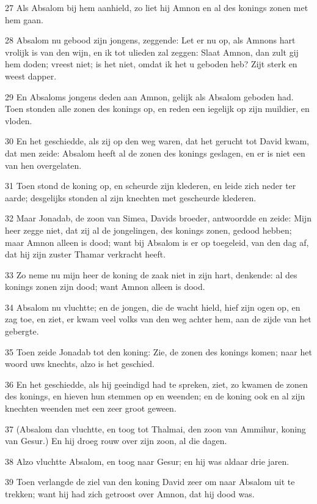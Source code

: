 \par 27 Als Absalom bij hem aanhield, zo liet hij Amnon en al des konings zonen met hem gaan.
\par 28 Absalom nu gebood zijn jongens, zeggende: Let er nu op, als Amnons hart vrolijk is van den wijn, en ik tot ulieden zal zeggen: Slaat Amnon, dan zult gij hem doden; vreest niet; is het niet, omdat ik het u geboden heb? Zijt sterk en weest dapper.
\par 29 En Absaloms jongens deden aan Amnon, gelijk als Absalom geboden had. Toen stonden alle zonen des konings op, en reden een iegelijk op zijn muildier, en vloden.
\par 30 En het geschiedde, als zij op den weg waren, dat het gerucht tot David kwam, dat men zeide: Absalom heeft al de zonen des konings geslagen, en er is niet een van hen overgelaten.
\par 31 Toen stond de koning op, en scheurde zijn klederen, en leide zich neder ter aarde; desgelijks stonden al zijn knechten met gescheurde klederen.
\par 32 Maar Jonadab, de zoon van Simea, Davids broeder, antwoordde en zeide: Mijn heer zegge niet, dat zij al de jongelingen, des konings zonen, gedood hebben; maar Amnon alleen is dood; want bij Absalom is er op toegeleid, van den dag af, dat hij zijn zuster Thamar verkracht heeft.
\par 33 Zo neme nu mijn heer de koning de zaak niet in zijn hart, denkende: al des konings zonen zijn dood; want Amnon alleen is dood.
\par 34 Absalom nu vluchtte; en de jongen, die de wacht hield, hief zijn ogen op, en zag toe, en ziet, er kwam veel volks van den weg achter hem, aan de zijde van het gebergte.
\par 35 Toen zeide Jonadab tot den koning: Zie, de zonen des konings komen; naar het woord uws knechts, alzo is het geschied.
\par 36 En het geschiedde, als hij geeindigd had te spreken, ziet, zo kwamen de zonen des konings, en hieven hun stemmen op en weenden; en de koning ook en al zijn knechten weenden met een zeer groot geween.
\par 37 (Absalom dan vluchtte, en toog tot Thalmai, den zoon van Ammihur, koning van Gesur.) En hij droeg rouw over zijn zoon, al die dagen.
\par 38 Alzo vluchtte Absalom, en toog naar Gesur; en hij was aldaar drie jaren.
\par 39 Toen verlangde de ziel van den koning David zeer om naar Absalom uit te trekken; want hij had zich getroost over Amnon, dat hij dood was.

